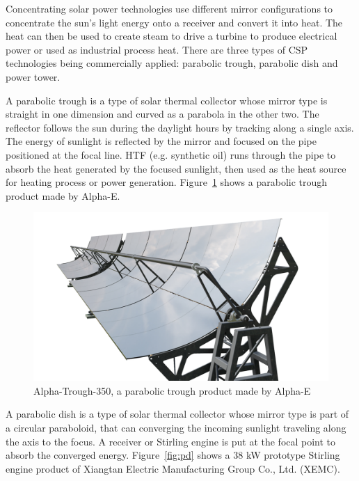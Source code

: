 Concentrating solar power technologies use different mirror configurations to concentrate the sun's light energy onto a receiver and convert it into heat. The heat can then be used to create steam to drive a turbine to produce electrical power or used as industrial process heat.
There are three types of CSP technologies being commercially applied: parabolic trough, parabolic dish and power tower.

A parabolic trough is a type of solar thermal collector whose mirror type is straight in one dimension and curved as a parabola in the other two. The reflector follows the sun during the daylight hours by tracking along a single axis. The energy of sunlight is reflected by the mirror and focused on the pipe positioned at the focal line. HTF (e.g. synthetic oil) runs through the pipe to absorb the heat generated by the focused sunlight, then used as the heat source for heating process or power generation. Figure~\ref{fig:pt} shows a parabolic trough product made by Alpha-E.
\begin{figure}[!ht]
\centering
\includegraphics[width=.8\textwidth]{fig/ParabolicTrough}
\caption{Alpha-Trough-350, a parabolic trough product made by Alpha-E}\label{fig:pt}
\end{figure}
A parabolic dish is a type of solar thermal collector whose mirror type is part of a circular paraboloid, that can converging the incoming sunlight traveling along the axis to the focus. A receiver or Stirling engine is put at the focal point to absorb the converged energy. Figure~\ref{fig:pd} shows a 38 kW prototype Stirling engine product of Xiangtan Electric Manufacturing Group Co., Ltd. (XEMC).
